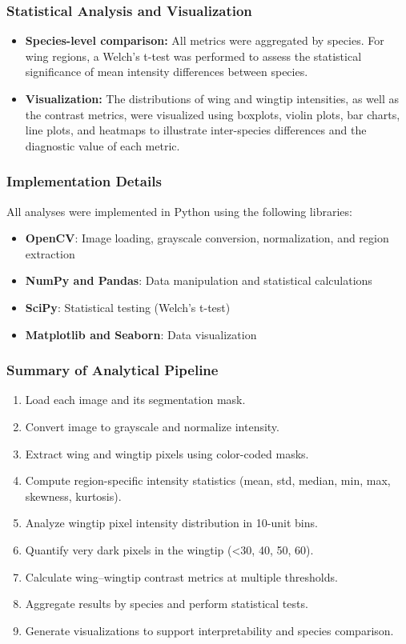 \documentclass[a4paper,12pt]{article}
\begin{document}
\subsubsection{Statistical Analysis and Visualization}

\begin{itemize}
    \item \textbf{Species-level comparison:} All metrics were aggregated by species. For wing regions, a Welch's t-test was performed to assess the statistical significance of mean intensity differences between species.
    \item \textbf{Visualization:} The distributions of wing and wingtip intensities, as well as the contrast metrics, were visualized using boxplots, violin plots, bar charts, line plots, and heatmaps to illustrate inter-species differences and the diagnostic value of each metric.
\end{itemize}

\subsubsection{Implementation Details}

All analyses were implemented in Python using the following libraries:
\begin{itemize}
    \item \textbf{OpenCV}: Image loading, grayscale conversion, normalization, and region extraction
    \item \textbf{NumPy and Pandas}: Data manipulation and statistical calculations
    \item \textbf{SciPy}: Statistical testing (Welch's t-test)
    \item \textbf{Matplotlib and Seaborn}: Data visualization
\end{itemize}

\subsubsection{Summary of Analytical Pipeline}

\begin{enumerate}
    \item Load each image and its segmentation mask.
    \item Convert image to grayscale and normalize intensity.
    \item Extract wing and wingtip pixels using color-coded masks.
    \item Compute region-specific intensity statistics (mean, std, median, min, max, skewness, kurtosis).
    \item Analyze wingtip pixel intensity distribution in 10-unit bins.
    \item Quantify very dark pixels in the wingtip (\textless 30, 40, 50, 60).
    \item Calculate wing--wingtip contrast metrics at multiple thresholds.
    \item Aggregate results by species and perform statistical tests.
    \item Generate visualizations to support interpretability and species comparison.
\end{enumerate}
\end{document}
